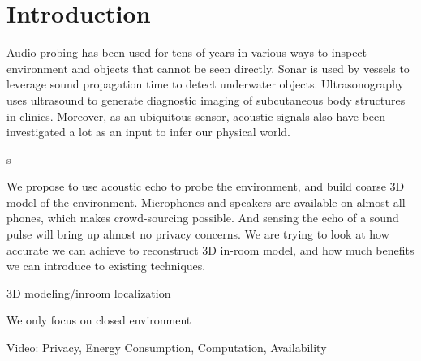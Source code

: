 \section{Introduction}
\label{sec:intro}

Audio probing has been used for tens of years in various ways to inspect 
environment and objects that cannot be seen directly. Sonar is used by vessels 
to leverage sound propagation 
time to detect underwater objects. Ultrasonography uses ultrasound to generate
diagnostic imaging of subcutaneous body structures in clinics. Moreover, 
as an ubiquitous sensor, acoustic signals also have been investigated a lot as 
an input to infer our physical world. 


s





We propose to use acoustic echo to probe the environment, and build coarse 3D model 
of the environment. Microphones and speakers are available on almost all phones, 
which makes crowd-sourcing possible. And 
sensing the echo of a sound pulse will bring up almost no privacy concerns. We are 
trying to look at how accurate we can achieve to reconstruct 3D in-room model, and 
how much benefits we can introduce to existing techniques.


3D modeling/inroom localization

We only focus on closed environment

Video: Privacy, Energy Consumption, Computation, Availability
